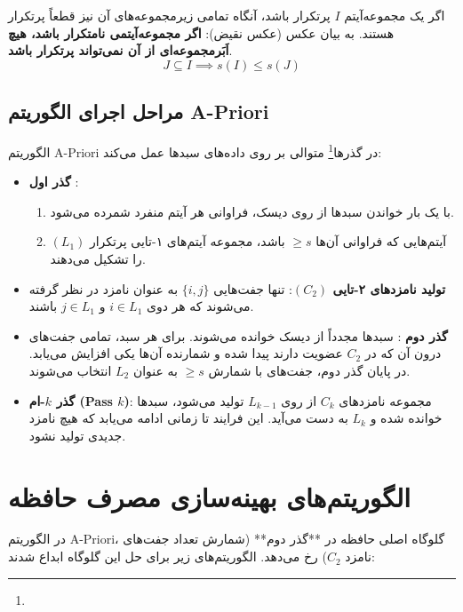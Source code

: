 \begin{theorem}
اگر یک مجموعه‌آیتم $I$ پرتکرار باشد، آنگاه تمامی زیرمجموعه‌های آن نیز قطعاً پرتکرار هستند.
به بیان عکس (عکس نقیض): \textbf{اگر مجموعه‌آیتمی نامتکرار باشد، هیچ اَبَرمجموعه‌ای از آن نمی‌تواند پرتکرار باشد}.
\begin{equation}
J \subseteq I \implies s(I) \le s(J)
\end{equation}
\end{theorem}

\subsection{مراحل اجرای الگوریتم A-Priori}
الگوریتم A-Priori در گذرها\footnote{} متوالی بر روی داده‌های سبدها عمل می‌کند:

\begin{algorithmbox}
\begin{itemize}
    \item \textbf{گذر اول }:
    \begin{enumerate}
        \item با یک بار خواندن سبدها از روی دیسک، فراوانی هر آیتم منفرد شمرده می‌شود.
        \item آیتم‌هایی که فراوانی آن‌ها $\ge s$ باشد، مجموعه آیتم‌های ۱-تایی پرتکرار $(L_1)$ را تشکیل می‌دهند.
    \end{enumerate}
    
    \item \textbf{تولید نامزدهای ۲-تایی $(C_2)$}:
    تنها جفت‌هایی $\{i, j\}$ به عنوان نامزد در نظر گرفته می‌شوند که هر دوی $i \in L_1$ و $j \in L_1$ باشند.
    
    \item \textbf{گذر دوم }:
    سبدها مجدداً از دیسک خوانده می‌شوند. برای هر سبد، تمامی جفت‌های درون آن که در $C_2$ عضویت دارند پیدا شده و شمارنده آن‌ها یکی افزایش می‌یابد. در پایان گذر دوم، جفت‌های با شمارش $\ge s$ به عنوان $L_2$ انتخاب می‌شوند.
    
    \item \textbf{گذر $k$-ام (Pass $k$)}:
    مجموعه نامزدهای $C_k$ از روی $L_{k-1}$ تولید می‌شود، سبدها خوانده شده و $L_k$ به دست می‌آید. این فرایند تا زمانی ادامه می‌یابد که هیچ نامزد جدیدی تولید نشود.
\end{itemize}
\end{algorithmbox}

\section{الگوریتم‌های بهینه‌سازی مصرف حافظه}
در الگوریتم A-Priori، گلوگاه اصلی حافظه در **گذر دوم** (شمارش تعداد جفت‌های نامزد $C_2$) رخ می‌دهد. الگوریتم‌های زیر برای حل این گلوگاه ابداع شدند:

